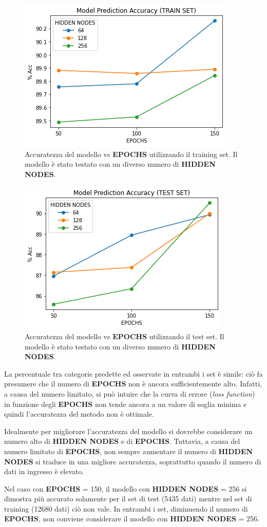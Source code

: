 \documentclass[10pt,a4paper]{report}
\begin{document}
\begin{figure}[htb]
\centering
\includegraphics[scale=.6]{Plot/Accuracy_train_vs_epochs.png}
\caption{Accuratezza del modello vs \textbf{EPOCHS} utilizzando il training set. Il modello è stato testato con un diverso numero di \textbf{HIDDEN NODES}.}
\label{acc_train}
\end{figure}

\begin{figure}[htb]
\centering
\includegraphics[scale=.6]{Plot/Accuracy_test_vs_epochs.png}
\caption{Accuratezza del modello vs \textbf{EPOCHS} utilizzando il test set. Il modello è stato testato con un diverso numero di \textbf{HIDDEN NODES}.}
\label{acc_test}
\end{figure}

La percentuale tra categorie predette ed osservate in entrambi i set è simile: ciò fa presumere che il numero di \textbf{EPOCHS} non è ancora sufficientemente alto. Infatti, a causa del numero limitato, si può intuire che la curva di errore (\textit{loss function}) in funzione degli \textbf{EPOCHS} non tende ancora a un valore di soglia minima e quindi l'accuratezza del metodo non è ottimale.

Idealmente per migliorare l'accuratezza del modello si dovrebbe considerare un numero alto di \textbf{HIDDEN NODES} e di \textbf{EPOCHS}. Tuttavia, a causa del numero limitato di \textbf{EPOCHS}, non sempre aumentare il numero di \textbf{HIDDEN NODES} si traduce in una migliore accuratezza, soprattutto quando il numero di dati in ingresso è elevato. 

Nel caso con \textbf{EPOCHS} = 150, il modello con \textbf{HIDDEN NODES} = 256 si dimostra più accurato solamente per il set di test (5435 dati) mentre nel set di training (12680 dati) ciò non vale.
In entrambi i set, diminuendo il numero di \textbf{EPOCHS}, non conviene considerare il modello con \textbf{HIDDEN NODES} = 256. 
\end{document}
